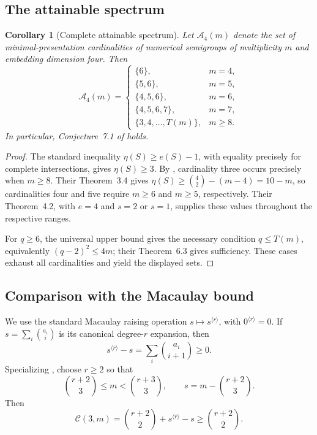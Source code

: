 \documentclass[11pt]{article}
\newtheorem{corollary}[theorem]{Corollary}
\begin{document}
\subsection{The attainable spectrum}
\medskip
\begin{corollary}[Complete attainable spectrum]\label{cor:spectrum}
Let \(\mathcal A_4(m)\) denote the set of minimal-presentation cardinalities
of numerical semigroups of multiplicity \(m\) and embedding dimension four.
Then
\[
\mathcal A_4(m)=
\begin{cases}
\{6\},&m=4,\\
\{5,6\},&m=5,\\
\{4,5,6\},&m=6,\\
\{4,5,6,7\},&m=7,\\
\{3,4,\ldots,T(m)\},&m\ge8.
\end{cases}
\]
In particular, Conjecture~7.1 of \cite{EHOOPK24} holds.\end{corollary}

\begin{proof}
The standard inequality \(\eta(S)\ge e(S)-1\), with equality precisely
for complete intersections, gives \(\eta(S)\ge3\). By
\cite[Propositions~6.2 and~7.6]{EHOOPK24}, cardinality three occurs
precisely when \(m\ge8\). Their Theorem~3.4 gives
\(\eta(S)\ge\binom42-(m-4)=10-m\), so cardinalities four and five
require \(m\ge6\) and \(m\ge5\), respectively. Their Theorem~4.2,
with \(e=4\) and \(s=2\) or \(s=1\), supplies these values throughout
the respective ranges.

For \(q\ge6\), the universal upper bound gives the necessary condition
\(q\le T(m)\), equivalently \((q-2)^2\le4m\); their Theorem~6.3
gives sufficiency. These cases exhaust all cardinalities and yield the
displayed sets.
\end{proof}

\subsection{Comparison with the Macaulay bound}

We use the standard Macaulay raising operation \(s\mapsto s^{\langle r\rangle}\),
with \(0^{\langle r\rangle}=0\). If
\(s=\sum_i\binom{a_i}{i}\) is its canonical degree-\(r\) expansion, then
\[
s^{\langle r\rangle}-s=\sum_i\binom{a_i}{i+1}\ge0.
\]
Specializing \cite[equation~(1)]{MS25}, choose \(r\ge2\) so that
\[
\binom{r+2}{3}\le m<\binom{r+3}{3},
\qquad s=m-\binom{r+2}{3}.
\]
Then
\[
\mathcal C(3,m)=\binom{r+2}{2}+s^{\langle r\rangle}-s
\ge\binom{r+2}{2}.
\]
\end{document}
